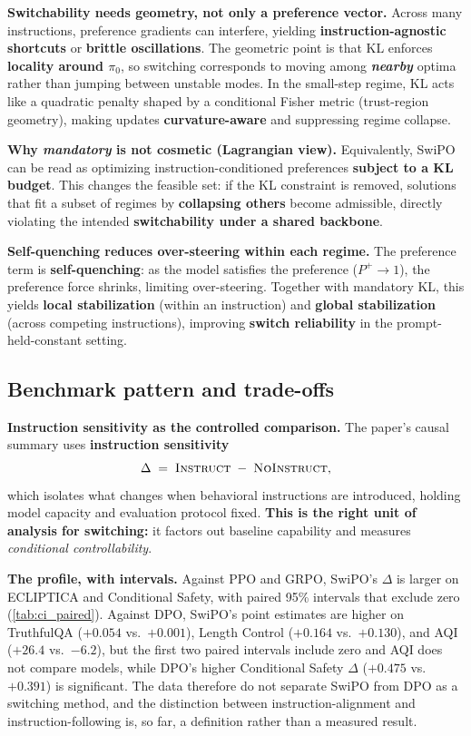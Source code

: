 \noindent\textbf{Switchability needs geometry, not only a preference vector.}
Across many instructions, preference gradients can interfere, yielding \textbf{instruction-agnostic shortcuts} or \textbf{brittle oscillations}. The geometric point is that KL enforces \textbf{locality around $\pi_0$}, so switching corresponds to moving among \textbf{\emph{nearby}} optima rather than jumping between unstable modes. In the small-step regime, KL acts like a quadratic penalty shaped by a conditional Fisher metric (trust-region geometry), making updates \textbf{curvature-aware} and suppressing regime collapse.

\noindent\textbf{Why \emph{mandatory} is not cosmetic (Lagrangian view).}
Equivalently, SwiPO can be read as optimizing instruction-conditioned preferences \textbf{subject to a KL budget}. This changes the feasible set: if the KL constraint is removed, solutions that fit a subset of regimes by \textbf{collapsing others} become admissible, directly violating the intended \textbf{switchability under a shared backbone}.

\noindent\textbf{Self-quenching reduces over-steering within each regime.}
The preference term is \textbf{self-quenching}: as the model satisfies the preference ($P^+\to 1$), the preference force shrinks, limiting over-steering. Together with mandatory KL, this yields \textbf{local stabilization} (within an instruction) and \textbf{global stabilization} (across competing instructions), improving \textbf{switch reliability} in the prompt-held-constant setting.

\vspace{-0.35em}
\subsection{Benchmark pattern and trade-offs}
\vspace{-0.2em}

\noindent\textbf{Instruction sensitivity as the controlled comparison.}
The paper's causal summary uses \textbf{instruction sensitivity}
\[
\Delta \;=\; \textsc{Instruct} \;-\; \textsc{NoInstruct},
\]
which isolates what changes when behavioral instructions are introduced, holding model capacity and evaluation protocol fixed. \textbf{This is the right unit of analysis for switching:} it factors out baseline capability and measures \emph{conditional controllability}.

\noindent\textbf{The profile, with intervals.}
Against PPO and GRPO, SwiPO's $\Delta$ is larger on ECLIPTICA and Conditional Safety, with paired 95\% intervals that exclude zero (\cref{tab:ci_paired}). Against DPO, SwiPO's point estimates are higher on TruthfulQA ($+0.054$ vs.\ $+0.001$), Length Control ($+0.164$ vs.\ $+0.130$), and AQI ($+26.4$ vs.\ $-6.2$), but the first two paired intervals include zero and AQI does not compare models, while DPO's higher Conditional Safety $\Delta$ ($+0.475$ vs.\ $+0.391$) is significant. The data therefore do not separate SwiPO from DPO as a switching method, and the distinction between instruction-alignment and instruction-following is, so far, a definition rather than a measured result.

